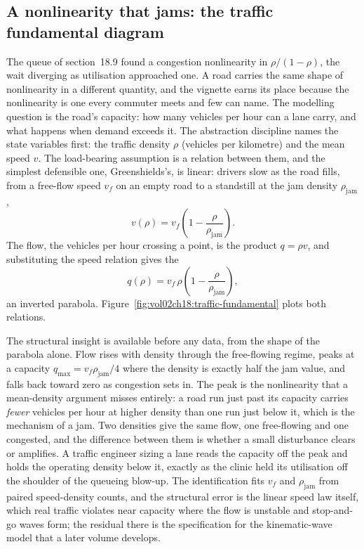 \subsection{A nonlinearity that jams: the traffic fundamental diagram}

The queue of section~18.9 found a congestion nonlinearity in $\rho/(1-\rho)$,
the wait diverging as utilisation approached one. A road carries the same shape
of nonlinearity in a different quantity, and the vignette earns its place
because the nonlinearity is one every commuter meets and few can name. The
modelling question is the road's capacity: how many vehicles per hour can a lane
carry, and what happens when demand exceeds it. The abstraction discipline names
the state variables first: the traffic density $\rho$ (vehicles per kilometre)
and the mean speed $v$. The load-bearing assumption is a relation between them,
and the simplest defensible one, Greenshields's, is linear: drivers slow as the
road fills, from a free-flow speed $v_f$ on an empty road to a standstill at the
jam density $\rho_{\text{jam}}$,
\[
v(\rho) = v_f\left(1 - \frac{\rho}{\rho_{\text{jam}}}\right).
\]
The flow, the vehicles per hour crossing a point, is the product $q = \rho v$,
and substituting the speed relation gives the 
\[
q(\rho) = v_f\,\rho\left(1 - \frac{\rho}{\rho_{\text{jam}}}\right),
\]
an inverted parabola. Figure~\ref{fig:vol02ch18:traffic-fundamental} plots both
relations.

The structural insight is available before any data, from the shape of the
parabola alone. Flow rises with density through the free-flowing regime, peaks at
a capacity $q_{\max} = v_f\rho_{\text{jam}}/4$ where the density is exactly half
the jam value, and falls back toward zero as congestion sets in. The peak is the
nonlinearity that a mean-density argument misses entirely: a road run just past
its capacity carries \emph{fewer} vehicles per hour at higher density than one
run just below it, which is the mechanism of a jam. Two densities give the same
flow, one free-flowing and one congested, and the difference between them is
whether a small disturbance clears or amplifies. A traffic engineer sizing a lane
reads the capacity off the peak and holds the operating density below it, exactly
as the clinic held its utilisation off the shoulder of the queueing blow-up. The
identification fits $v_f$ and $\rho_{\text{jam}}$ from paired speed-density
counts, and the structural error is the linear speed law itself, which real
traffic violates near capacity where the flow is unstable and stop-and-go waves
form; the residual there is the specification for the kinematic-wave model that a
later volume develops.

